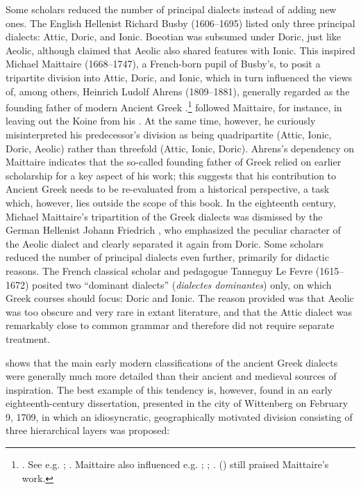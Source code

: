 Some scholars reduced the number of principal dialects instead of adding new ones. The English Hellenist Richard Busby (1606–1695) listed only three principal dialects: Attic, Doric, and Ionic. Boeotian was subsumed under Doric, just like Aeolic, although \citet[66--67]{Busby1696} claimed that Aeolic also shared features with Ionic. This inspired Michael Maittaire (1668–1747), a French-born pupil of Busby’s, to posit a tripartite division into Attic, Doric, and Ionic, which in turn influenced the views of, among others, Heinrich Ludolf Ahrens (1809–1881), generally regarded as the founding father of modern Ancient Greek .\footnote{\citet[i–ii]{Maittaire1706}. See e.g. \citet[177]{Brekle1992}; \citet[463]{Finkelberg2014}. Maittaire also influenced e.g. \citet[213]{Thompson1732}; \citet[162]{Gesner1774}; \citet[\textsc{xxviii}]{Harles1778}. \citeauthor{Pott1974} (\citeyear[92]{Pott1974}) still praised Maittaire’s work.} \citet[1]{Ahrens1839} followed Maittaire, for instance, in leaving out the Koine from his . At the same time, however, he curiously misinterpreted his predecessor’s division as being quadripartite (Attic, Ionic, Doric, Aeolic) rather than threefold (Attic, Ionic, Doric). Ahrens’s dependency on Maittaire indicates that the so-called founding father of Greek  relied on earlier scholarship for a key aspect of his work; this suggests that his contribution to Ancient Greek  needs to be re-evaluated from a historical perspective, a task which, however, lies outside the scope of this book. In the eighteenth century, Michael Maittaire’s tripartition of the Greek dialects was dismissed by the German Hellenist Johann Friedrich \citet[\textsc{iv–v}]{Facius1782}, who emphasized the peculiar character of the Aeolic dialect and clearly separated it again from Doric. Some scholars reduced the number of principal dialects even further, primarily for didactic reasons. The French classical scholar and pedagogue Tanneguy Le Fevre (1615–1672) posited two “dominant dialects” (\textit{dialectes dominantes}) only, on which Greek courses should focus: Doric and Ionic. The reason \citet[61]{Le1731} provided was that Aeolic was too obscure and very rare in extant literature, and that the Attic dialect was remarkably close to common grammar and therefore did not require separate treatment.

 shows that the main early modern classifications of the ancient Greek dialects were generally much more detailed than their ancient and medieval sources of inspiration. The best example of this tendency is, however, found in an early eighteenth-century dissertation, presented in the city of Wittenberg on February 9, 1709, in which an idiosyncratic, geographically motivated division consisting of three hierarchical layers was proposed:

